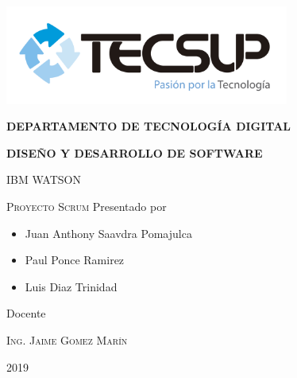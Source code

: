 \begin{titlepage}
	\centering
	\includegraphics[width=0.70\textwidth]{img/logo_tecsup_final}\par\vspace{1cm}
	\vspace{0.30cm}	
	{\scshape\large\bfseries DEPARTAMENTO DE TECNOLOG\'IA DIGITAL \par}
	\vspace{0.60cm}	
	{\scshape\large\bfseries DISEÑO Y DESARROLLO DE SOFTWARE  \par}
	\vspace{2.00cm}		
	{\large\large IBM WATSON \par}
	\vspace{0.60cm}
	{\scshape\large Proyecto Scrum }
	\vspace{0.60cm}
	\vfill
	Presentado por \par
	{\large\itshape { 
		\begin{itemize}
			\item Juan Anthony Saavdra Pomajulca
			\item Paul Ponce Ramirez
			\item Luis Diaz Trinidad
		\end{itemize} 
	}\par}
	\vspace{0.30cm}
	\vfill
	Docente \par
  \vspace{0.30cm}
	\vfill
	\textsc{Ing. Jaime Gomez Marín}
	
  \vspace{0.30cm}
	\vfill
        {\large 2019 \par}
\end{titlepage}

